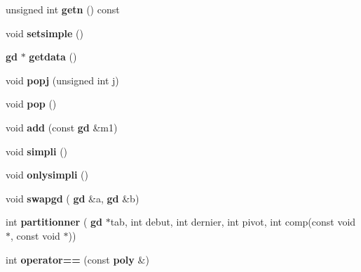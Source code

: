 \begin{DoxyCompactItemize}
unsigned int {\bfseries getn} () const
\item 
\mbox{\label{classmmgd_1_1mmgd_1_1poly_aa746644a922405f6903d54657d4a23d8}} 
void {\bfseries setsimple} ()
\item 
\mbox{\label{classmmgd_1_1mmgd_1_1poly_a7d94298c4fb9eaca0c40f9aa87411084}} 
\textbf{ gd} $\ast$ {\bfseries getdata} ()
\item 
\mbox{\label{classmmgd_1_1mmgd_1_1poly_a184a9b26eed443676f8d55919856a363}} 
void {\bfseries popj} (unsigned int j)
\item 
\mbox{\label{classmmgd_1_1mmgd_1_1poly_a8b72b2a38fe605ee83d03c546315feaa}} 
void {\bfseries pop} ()
\item 
\mbox{\label{classmmgd_1_1mmgd_1_1poly_a0b40ee1475cd9d321ddea43dde871321}} 
void {\bfseries add} (const \textbf{ gd} \&m1)
\item 
\mbox{\label{classmmgd_1_1mmgd_1_1poly_a49ff0c355621ee90b83986b5c21a681b}} 
void {\bfseries simpli} ()
\item 
\mbox{\label{classmmgd_1_1mmgd_1_1poly_a7c0e2e60fb473ecd70af742d6cfb8214}} 
void {\bfseries onlysimpli} ()
\item 
\mbox{\label{classmmgd_1_1mmgd_1_1poly_ad68f2edd232976c15cd58ce821376c28}} 
void {\bfseries swapgd} (\textbf{ gd} \&a, \textbf{ gd} \&b)
\item 
\mbox{\label{classmmgd_1_1mmgd_1_1poly_a1ab826d07bbcdab487006a492c21a2fb}} 
int {\bfseries partitionner} (\textbf{ gd} $\ast$tab, int debut, int dernier, int pivot, int comp(const void $\ast$, const void $\ast$))
\item 
\mbox{\label{classmmgd_1_1mmgd_1_1poly_ae121ae3e10e8252bc9b9c1b745867a8b}} 
int {\bfseries operator==} (const \textbf{ poly} \&)
\end{DoxyCompactItemize}
